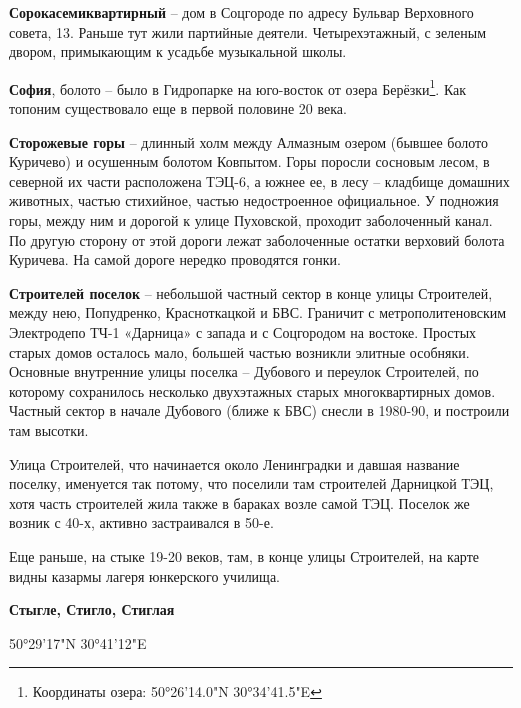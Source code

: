 \medskip




\textbf{Сорокасемиквартирный} – дом в Соцгороде по адресу Бульвар Верховного совета, 13. Раньше тут жили партийные деятели. Четырехэтажный, с зеленым двором, примыкающим к усадьбе музыкальной школы.\\

\medskip


\textbf{София}, болото – было в Гидропарке на юго-восток от озера Берёзки\footnote{Координаты озера: 50°26'14.0"N 30°34'41.5"E}. Как топоним существовало еще в первой половине 20 века.\\

\medskip

 
\textbf{Сторожевые горы} – длинный холм между Алмазным озером (бывшее болото Куричево) и осушенным болотом Ковпытом. Горы поросли сосновым лесом, в северной их части расположена ТЭЦ-6, а южнее ее, в лесу – кладбище домашних животных, частью стихийное, частью недостроенное официальное. У подножия горы, между ним и дорогой к улице Пуховской, проходит заболоченный канал. По другую сторону от этой дороги лежат заболоченные остатки верховий болота Куричева. На самой дороге нередко проводятся гонки.\\

\medskip

\textbf{Строителей поселок} – небольшой частный сектор в конце улицы Строителей, между нею, Попудренко, Красноткацкой и БВС. Граничит с метрополитеновским Электродепо ТЧ-1 «Дарница» с запада и с Соцгородом на востоке. Простых старых домов осталось мало, большей частью возникли элитные особняки. Основные внутренние улицы поселка – Дубового и переулок Строителей, по которому сохранилось несколько двухэтажных старых многоквартирных домов. Частный сектор в начале Дубового (ближе к БВС) снесли в 1980-90, и построили там высотки.

Улица Строителей, что начинается около Ленинградки и давшая название поселку, именуется так потому, что поселили там строителей Дарницкой ТЭЦ, хотя часть строителей жила также в бараках возле самой ТЭЦ. Поселок же возник с 40-х, активно застраивался в 50-е.

Еще раньше, на стыке 19-20 веков, там, в конце улицы Строителей, на карте видны казармы лагеря юнкерского училища.\\

\medskip

\textbf{Стыгле, Стигло, Стиглая}

50°29'17"N 30°41'12"E

